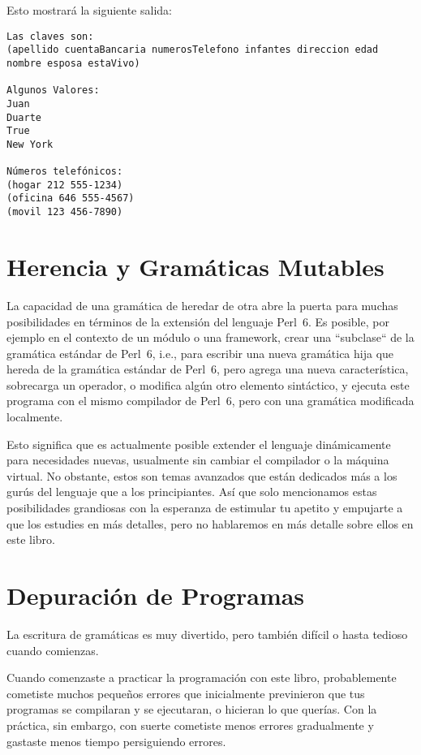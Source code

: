 Esto mostrará la siguiente salida:

\begin{verbatim}
Las claves son:
(apellido cuentaBancaria numerosTelefono infantes direccion edad nombre esposa estaVivo)

Algunos Valores:
Juan
Duarte
True
New York

Números telefónicos:
(hogar 212 555-1234)
(oficina 646 555-4567)
(movil 123 456-7890)
\end{verbatim}

\section{Herencia y Gramáticas Mutables}

La capacidad de una gramática de heredar de otra abre la
puerta para muchas posibilidades en términos de la extensión
del lenguaje Perl~6. Es posible, por ejemplo en el contexto de
un módulo o una framework, crear una ``subclase`` de la 
gramática estándar de Perl~6, i.e., para escribir una nueva
gramática hija que hereda de la gramática estándar de Perl~6, pero
agrega una nueva característica, sobrecarga un operador, o modifica
algún otro elemento sintáctico, y ejecuta este programa con el 
mismo compilador de Perl~6, pero con una gramática modificada
localmente.

Esto significa que es actualmente posible extender el lenguaje 
dinámicamente para necesidades nuevas, usualmente sin cambiar
el compilador o la máquina virtual. No obstante, estos son temas
avanzados que están dedicados más a los gurús del lenguaje 
que a los principiantes. Así que solo mencionamos estas posibilidades
grandiosas con la esperanza de estimular tu apetito y empujarte a
que los estudies en más detalles, pero no hablaremos en más detalle
sobre ellos en este libro.

\section{Depuración de Programas}

La escritura de gramáticas es muy divertido, pero también difícil
o hasta tedioso cuando comienzas.

Cuando comenzaste a practicar la programación con este libro,
probablemente cometiste muchos pequeños errores que inicialmente
previnieron que tus programas se compilaran y se ejecutaran, o
hicieran lo que querías. Con la práctica, sin embargo, con suerte
cometiste menos errores gradualmente y gastaste menos tiempo 
persiguiendo errores.


